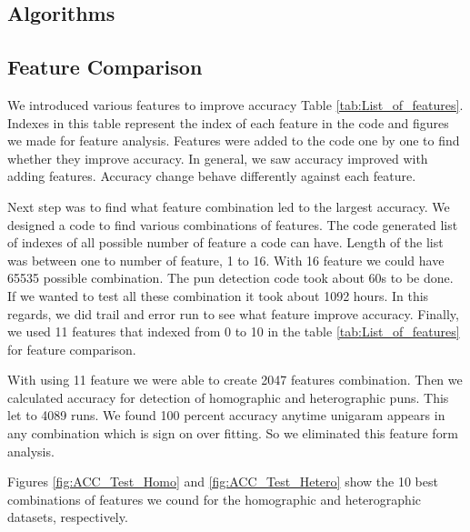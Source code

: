 \documentclass{article}
\begin{document}
\subsection{Algorithms}

\subsection{Feature Comparison}

We introduced various features to improve accuracy
Table \ref{tab:List_of_features}. Indexes in this table represent the index of
each feature in the code and figures we made for feature analysis. Features
were added to the code one by one to find whether they improve accuracy. In
general, we saw accuracy improved with adding features. Accuracy change behave
differently against each feature.

Next step was to find what feature combination led to the largest accuracy. We
designed a code to find various combinations of features. The code generated
list of indexes of all possible number of feature a code can have. Length of
the list was between one to number of feature, 1 to 16. With 16 feature we
could have 65535 possible combination.  The pun detection code took about 60s
to be done. If we wanted to test all these combination it took about 1092
hours. In this regards, we did trail and error run to see what feature improve
accuracy. Finally, we used 11 features that indexed from 0 to 10 in the
table \ref{tab:List_of_features} for feature comparison.

With using 11 feature we were able to create 2047 features combination. Then we
calculated accuracy for detection of homographic and heterographic puns. This
let to 4089 runs. We found 100 percent accuracy anytime unigaram appears in any
combination which is sign on over fitting. So we eliminated this feature form
analysis.

Figures \ref{fig:ACC_Test_Homo} and \ref{fig:ACC_Test_Hetero} show the 10 best
combinations of features we cound for the homographic and heterographic
datasets, respectively.
\end{document}
